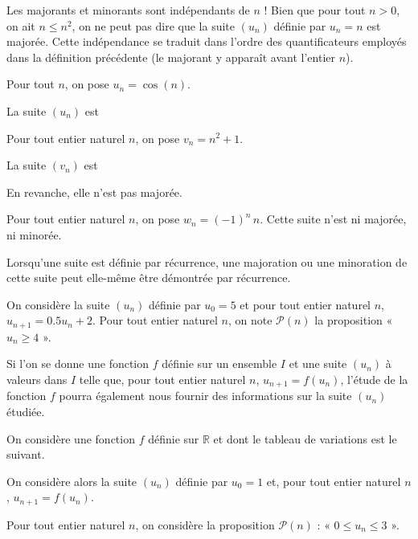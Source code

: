 \documentclass[11pt,fleqn]{book} %
\begin{document}
Les majorants et minorants sont indépendants de $n$ ! Bien que pour tout $n>0$, on ait $n \leqslant n^2$, on ne peut pas dire que la suite $(u_n)$ définie par $u_n=n$ est majorée. Cette indépendance se traduit dans l'ordre des quantificateurs employés dans la définition précédente (le majorant y apparaît avant l'entier $n$).


\begin{example}Pour tout $n$, on pose $u_n=\cos (n)$. 

La suite $(u_n)$ est \end{example}

\begin{example} Pour tout entier naturel $n$, on pose $v_n=n^2+1$.

La suite $(v_n)$ est

En revanche, elle n'est pas majorée. \end{example}

\begin{example} Pour tout entier naturel $n$, on pose $w_n=(-1)^n \, n$. Cette suite n'est ni majorée, ni minorée.\end{example}

Lorsqu'une suite est définie par récurrence, une majoration ou une minoration de cette suite peut elle-même être démontrée par récurrence.

\begin{example} On considère la suite $(u_n)$ définie par $u_0 = 5$ et pour tout entier naturel $n$, $u_{n+1}=0.5u_n + 2$. Pour tout entier naturel $n$, on note $\mathcal{P}(n)$ la proposition « $u_n \geqslant 4$ ».


\vskip100pt
\end{example}

\newpage

Si l'on se donne une fonction $f$ définie sur un ensemble $I$ et une suite $(u_n)$ à valeurs dans $I$ telle que, pour tout entier naturel $n$, $u_{n+1}=f(u_n)$, l'étude de la fonction $f$ pourra également nous fournir des informations sur la suite $(u_n)$ étudiée.

\begin{example}On considère une fonction $f$ définie sur $\mathbb{R}$ et dont le tableau de variations est le suivant.

\begin{center}
\end{center}

On considère alors la suite $(u_n)$ définie par $u_0=1$ et, pour tout entier naturel $n$, $u_{n+1}=f(u_n)$. 

Pour tout entier naturel $n$, on considère la proposition $\mathcal{P}(n)$ : « $0 \leqslant u_n \leqslant 3$ ».
\vskip200pt
\end{example}
\end{document}
